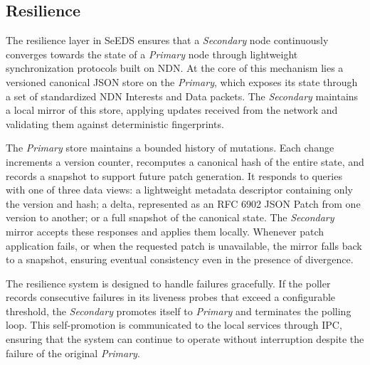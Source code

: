 \documentclass{article}
\begin{document}
\subsection{Resilience}

The resilience layer in SeEDS ensures that a \emph{Secondary} node continuously converges towards the state of a \emph{Primary} node through lightweight synchronization protocols built on NDN. At the core of this mechanism lies a versioned canonical JSON store on the \emph{Primary}, which exposes its state through a set of standardized NDN Interests and Data packets. The \emph{Secondary} maintains a local mirror of this store, applying updates received from the network and validating them against deterministic fingerprints.

The \emph{Primary} store maintains a bounded history of mutations. Each change increments a version counter, recomputes a canonical hash of the entire state, and records a snapshot to support future patch generation. It responds to queries with one of three data views: a lightweight metadata descriptor containing only the version and hash; a delta, represented as an RFC 6902 JSON Patch from one version to another; or a full snapshot of the canonical state. The \emph{Secondary} mirror accepts these responses and applies them locally. Whenever patch application fails, or when the requested patch is unavailable, the mirror falls back to a snapshot, ensuring eventual consistency even in the presence of divergence.

The resilience system is designed to handle failures gracefully. If the poller records consecutive failures in its liveness probes that exceed a configurable threshold, the \emph{Secondary} promotes itself to \emph{Primary} and terminates the polling loop. This self-promotion is communicated to the local services through IPC, ensuring that the system can continue to operate without interruption despite the failure of the original \emph{Primary}.
\end{document}
